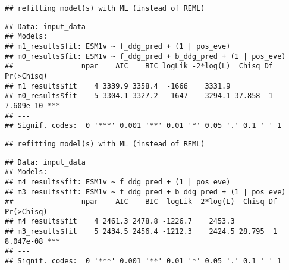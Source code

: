 \documentclass[
]{article}
\newenvironment{Shaded}{\begin{snugshade}}{\end{snugshade}}
\newcommand{\CommentTok}[1]{\textcolor[rgb]{0.56,0.35,0.01}{\textit{#1}}}
\newcommand{\FunctionTok}[1]{\textcolor[rgb]{0.13,0.29,0.53}{\textbf{#1}}}
\newcommand{\NormalTok}[1]{#1}
\newcommand{\SpecialCharTok}[1]{\textcolor[rgb]{0.81,0.36,0.00}{\textbf{#1}}}
\begin{document}
\begin{verbatim}
## refitting model(s) with ML (instead of REML)
\end{verbatim}

\begin{verbatim}
## Data: input_data
## Models:
## m1_results$fit: ESM1v ~ f_ddg_pred + (1 | pos_eve)
## m0_results$fit: ESM1v ~ f_ddg_pred + b_ddg_pred + (1 | pos_eve)
##                npar    AIC    BIC logLik -2*log(L)  Chisq Df Pr(>Chisq)    
## m1_results$fit    4 3339.9 3358.4  -1666    3331.9                         
## m0_results$fit    5 3304.1 3327.2  -1647    3294.1 37.858  1  7.609e-10 ***
## ---
## Signif. codes:  0 '***' 0.001 '**' 0.01 '*' 0.05 '.' 0.1 ' ' 1
\end{verbatim}

\begin{Shaded}
\end{Shaded}

\begin{verbatim}
## refitting model(s) with ML (instead of REML)
\end{verbatim}

\begin{verbatim}
## Data: input_data
## Models:
## m4_results$fit: ESM1v ~ f_ddg_pred + (1 | pos_eve)
## m3_results$fit: ESM1v ~ f_ddg_pred + b_ddg_pred + (1 | pos_eve)
##                npar    AIC    BIC  logLik -2*log(L)  Chisq Df Pr(>Chisq)    
## m4_results$fit    4 2461.3 2478.8 -1226.7    2453.3                         
## m3_results$fit    5 2434.5 2456.4 -1212.3    2424.5 28.795  1  8.047e-08 ***
## ---
## Signif. codes:  0 '***' 0.001 '**' 0.01 '*' 0.05 '.' 0.1 ' ' 1
\end{verbatim}
\end{document}
